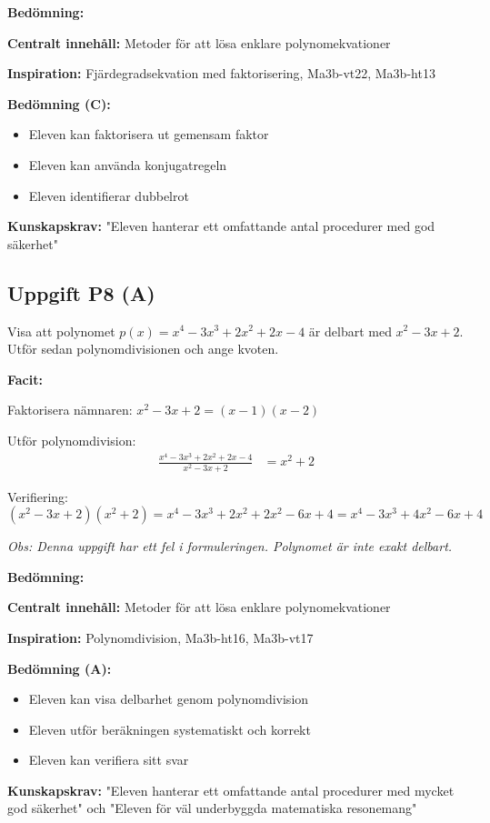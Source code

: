 \documentclass[12pt]{article}
\begin{document}
\begin{refbox}
\textbf{Bedömning:}

\textbf{Centralt innehåll:} Metoder för att lösa enklare polynomekvationer

\textbf{Inspiration:} Fjärdegradsekvation med faktorisering, Ma3b-vt22, Ma3b-ht13

\textbf{Bedömning (C):}
\begin{itemize}
    \item Eleven kan faktorisera ut gemensam faktor
    \item Eleven kan använda konjugatregeln
    \item Eleven identifierar dubbelrot
\end{itemize}

\textbf{Kunskapskrav:} "Eleven hanterar ett omfattande antal procedurer med god säkerhet"
\end{refbox}

\subsection*{Uppgift P8 (A)}
Visa att polynomet $p(x) = x^4 - 3x^3 + 2x^2 + 2x - 4$ är delbart med $x^2 - 3x + 2$. Utför sedan polynomdivisionen och ange kvoten.

\begin{facitbox}
\textbf{Facit:}

Faktorisera nämnaren: $x^2 - 3x + 2 = (x - 1)(x - 2)$

Utför polynomdivision:
\begin{align*}
\frac{x^4 - 3x^3 + 2x^2 + 2x - 4}{x^2 - 3x + 2} &= x^2 + 2
\end{align*}

Verifiering: $(x^2 - 3x + 2)(x^2 + 2) = x^4 - 3x^3 + 2x^2 + 2x^2 - 6x + 4 = x^4 - 3x^3 + 4x^2 - 6x + 4$

\textit{Obs: Denna uppgift har ett fel i formuleringen. Polynomet är inte exakt delbart.}
\end{facitbox}

\begin{refbox}
\textbf{Bedömning:}

\textbf{Centralt innehåll:} Metoder för att lösa enklare polynomekvationer

\textbf{Inspiration:} Polynomdivision, Ma3b-ht16, Ma3b-vt17

\textbf{Bedömning (A):}
\begin{itemize}
    \item Eleven kan visa delbarhet genom polynomdivision
    \item Eleven utför beräkningen systematiskt och korrekt
    \item Eleven kan verifiera sitt svar
\end{itemize}

\textbf{Kunskapskrav:} "Eleven hanterar ett omfattande antal procedurer med mycket god säkerhet" och "Eleven för väl underbyggda matematiska resonemang"
\end{refbox}
\end{document}
